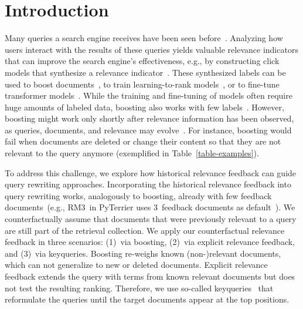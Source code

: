 \section{Introduction}

Many queries a search engine receives have been seen before~\cite{DBLP:journals/sigir/SilversteinHMM99}. Analyzing how users interact with the results of these queries yields valuable relevance indicators that can improve the search engine's effectiveness, e.g., by constructing click models that synthesize a relevance indicator~\cite{chuklin:2015}. These synthesized labels can be used to boost documents~\cite{keller:2024b}, to train learning-to-rank models~\cite{liu:2011}, or to fine-tune transformer models~\cite{lin:2021}. While the training and fine-tuning of models often require huge amounts of labeled data, boosting also works with few labels~\cite{keller:2024b}. However, boosting might work only shortly after relevance information has been observed, as queries, documents, and relevance may evolve~\cite{keller:2024}. For instance, boosting would fail when documents are deleted or change their content so that they are not relevant to the query anymore (exemplified in Table~\ref{table-examples}).





To address this challenge, we explore how historical relevance feedback can guide query rewriting approaches. Incorporating the historical relevance feedback into query rewriting works, analogously to boosting, already with few feedback documents~(e.g., RM3~in PyTerrier uses 3~feedback documents as default~\cite{macdonald:2020}). We counterfactually assume that documents that were previously relevant to a query are still part of the retrieval collection. We apply our counterfactual relevance feedback in three scenarios: (1)~via boosting, (2)~via explicit relevance feedback, and (3)~via keyqueries. Boosting re-weighs known (non-)relevant documents, which can not generalize to new or deleted documents. Explicit relevance feedback extends the query with terms from known relevant documents but does not test the resulting ranking. Therefore, we use so-called keyqueries~\cite{gollub:2013a} that reformulate the queries until the target documents appear at the top positions.

